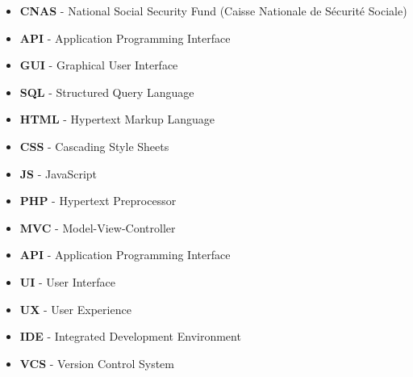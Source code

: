 \documentclass[12pt]{report}
\begin{document}
\begin{itemize}
    \item \textbf{CNAS} - National Social Security Fund (Caisse Nationale de Sécurité Sociale)
    \item \textbf{API} - Application Programming Interface
    \item \textbf{GUI} - Graphical User Interface
    \item \textbf{SQL} - Structured Query Language
    \item \textbf{HTML} - Hypertext Markup Language
    \item \textbf{CSS} - Cascading Style Sheets
    \item \textbf{JS} - JavaScript
    \item \textbf{PHP} - Hypertext Preprocessor
    \item \textbf{MVC} - Model-View-Controller
    \item \textbf{API} - Application Programming Interface
    \item \textbf{UI} - User Interface
    \item \textbf{UX} - User Experience
    \item \textbf{IDE} - Integrated Development Environment
    \item \textbf{VCS} - Version Control System
\end{itemize}









 

\end{document}
